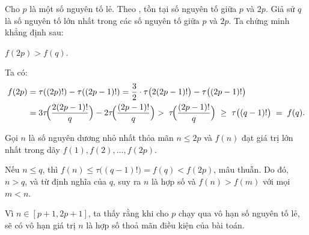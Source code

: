 \documentclass[../04-diophantine-equations.tex]{subfiles}
\begin{document}
\begin{soln}\footnotemark
	Cho \( p \) là một số nguyên tố lẻ. Theo , tồn tại số nguyên tố giữa \(p\) và \(2p\).  
	Giả sử \( q \) là số nguyên tố lớn nhất trong các số nguyên tố giữa \( p \) và \( 2p \).  
	Ta chứng minh khẳng định sau:

	\begin{claim*}
		\( f(2p) > f(q) \).
	\end{claim*}

	\begin{subproof}
		Ta có:
		\[
			\begin{aligned} 
				f(2p) &= \tau((2p)!) - \tau((2p-1)!) 
				= \frac{3}{2} \cdot \tau\bigl(2(2p-1)!\bigr) - \tau\bigl((2p-1)!\bigr) \\ 
			 	&= 3\tau\!\Bigl(\frac{2(2p-1)!}{q}\Bigr) - 2\tau\!\Bigl(\frac{(2p-1)!}{q}\Bigr) 
			  	>\; \tau\!\Bigl(\frac{(2p-1)!}{q}\Bigr) \;\geq\; \tau\bigl((q-1)!\bigr) \;=\; f(q).
			\end{aligned}
		\]
	\end{subproof}

	Gọi \( n \) là số nguyên dương nhỏ nhất thỏa mãn \( n \leq 2p \) và \( f(n) \) đạt giá trị lớn nhất trong dãy \( f(1), f(2), \dots, f(2p) \).  
			
	Nếu \( n \leq q \), thì \( f(n) \leq \tau\bigl((q-1)!\bigr) = f(q) < f(2p) \), mâu thuẫn.  
	Do đó, \( n > q \), và từ định nghĩa của \( q \), suy ra \( n \) là hợp số và \( f(n) > f(m) \) với mọi \( m < n \). 
	
	Vì \( n \in [p+1, 2p+1] \), ta thấy rằng khi cho \( p \) chạy qua vô hạn số nguyên tố lẻ, sẽ có vô hạn giá trị \( n \) là hợp số thoả mãn điều kiện của bài toán.
\end{soln}

\end{document}

